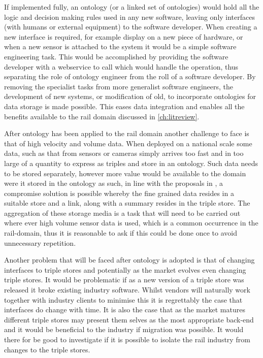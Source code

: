 If implemented fully, an ontology (or a linked set of ontologies) would hold all the logic and decision making rules used in any new software, leaving only interfaces (with humans or external equipment) to the software developer.  When creating a new interface is required, for example display on a new piece of hardware, or when a new sensor is attached to the system it would be a simple software engineering task. This would be accomplished by providing the software developer with a webservice to call which would handle the operation, thus separating the role of ontology engineer from the roll of a software developer. By removing the specialist tasks from more generalist software engineers, the development of new systems, or modification of old, to incorporate ontologies for data storage is made possible. This eases data integration and enables all the benefits available to the rail domain discussed in \autoref{ch:litreview}.

After ontology has been applied to the rail domain another challenge to face is that of high velocity and volume data. When deployed on a national scale some data, such as that from sensors or cameras simply arrives too fast and in too large of a quantity to express as triples and store in an ontology. Such data needs to be stored separately, however more value would be available to the domain were it stored in the ontology as such, in line with the proposals in \citep{Tutcher2015}, a compromise solution is possible whereby the fine grained data resides in a suitable store and a link, along with a summary resides in the triple store. The aggregation of these storage media is a task that will need to be carried out where ever high volume sensor data is used, which is a common occurrence in the rail-domain, thus it is reasonable to ask if this could be done once to avoid unnecessary repetition.

Another problem that will be faced after ontology is adopted is that of changing interfaces to triple stores and potentially as the market evolves even changing triple stores. It would be problematic if as a new version of a triple store was released it broke existing industry software. Whilst vendors will naturally work together with industry clients to minimise this it is regrettably the case that interfaces do change with time. It is also the case that as the market matures different triple stores may present them selves as the most appropriate back-end and it would be beneficial to the industry if migration was possible. It would there for be good to investigate if it is possible to isolate the rail industry from changes to the triple stores.

